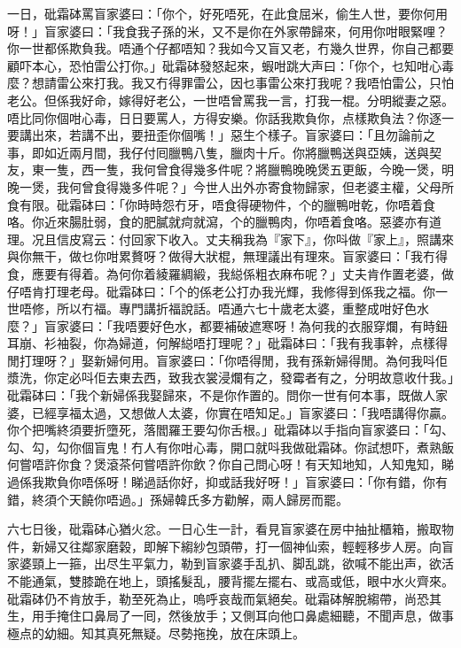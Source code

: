 \documentclass[a5paper, 12pt, openany]{book} %
\begin{document}
	一日，砒霜砵罵盲家婆曰：「你个，好死唔死，在此食屈米，偷生人世，要你何用呀！」盲家婆曰：「我食我子孫的米，又不是你在外家帶歸來，何用你咁眼緊哩？你一世都係欺負我。唔通个仔都唔知？我如今又盲又老，冇幾久世界，你自己都要顧吓本心，恐怕雷公打你。」砒霜砵發怒起來，蝦咁跳大声曰：「你个，乜知咁心毒麼？想請雷公來打我。我又冇得罪雷公，因乜事雷公來打我呢？我唔怕雷公，只怕老公。但係我好命，嫁得好老公，一世唔曾罵我一言，打我一棍。分明縱妻之惡。唔比同你個咁心毒，日日要罵人，方得安樂。你話我欺負你，点樣欺負法？你逐一要講出來，若講不出，要扭歪你個嘴！」惡生个樣子。盲家婆曰：「且勿論前之事，即如近兩月間，我仔付囘臘鴨八隻，臘肉十斤。你將臘鴨送與亞姨，送與契友，東一隻，西一隻，我何曾食得幾多件呢？將臘鴨晚晚煲五更飯，今晚一煲，明晚一煲，我何曾食得幾多件呢？」今世人出外亦寄食物歸家，但老婆主權，父母所食有限。砒霜砵曰：「你時時怨冇牙，唔食得硬物件，个的臘鴨咁乾，你唔着食咯。你近來腸肚弱，食的肥膩就疴就瀉，个的臘鴨肉，你唔着食咯。惡婆亦有道理。况且信皮寫云：付回家下收入。丈夫稱我為『家下』，你呌做『家上』，照講來與你無干，做乜你咁累贅呀？做得大狀棍，無理議出有理來。盲家婆曰：「我冇得食，應要有得着。為何你着綾羅綢緞，我縂係粗衣麻布呢？」丈夫肯作置老婆，做仔唔肯打理老母。砒霜砵曰：「个的係老公打办我光輝，我修得到係我之福。你一世唔修，所以冇福。專門講折福說話。唔通六七十歲老太婆，重整成咁好色水麼？」盲家婆曰：「我唔要好色水，都要補破遮寒呀！為何我的衣服穿爛，有時鈕耳崩、衫袖裂，你為婦道，何解縂唔打理呢？」砒霜砵曰：「我有我事幹，点樣得閒打理呀？」娶新婦何用。盲家婆曰：「你唔得閒，我有孫新婦得閒。為何我呌佢漿洗，你定必呌佢去東去西，致我衣裳浸爛有之，發霉者有之，分明故意收什我。」砒霜砵曰：「我个新婦係我娶歸來，不是你作置的。問你一世有何本事，既做人家婆，已經享福太過，又想做人太婆，你實在唔知足。」盲家婆曰：「我唔講得你贏。你个把嘴終須要折墮死，落閻羅王要勾你舌根。」砒霜砵以手指向盲家婆曰：「勾、勾、勾，勾你個盲鬼！冇人有你咁心毒，開口就呌我做砒霜砵。你試想吓，煮熟飯何嘗唔許你食？煲滾茶何嘗唔許你飲？你自己問心呀！有天知地知，人知鬼知，睇過係我欺負你唔係呀！睇過話你好，抑或話我好呀！」盲家婆曰：「你有錯，你有錯，終須个天饒你唔過。」孫婦韓氏多方勸解，兩人歸房而罷。

	六七日後，砒霜砵心猶火忿。一日心生一計，看見盲家婆在房中抽扯櫃箱，搬取物件，新婦又往鄰家磨榖，即解下縐紗包頭帶，打一個神仙索，輕輕移步人房。向盲家婆頸上一箍，出尽生平氣力，勒到盲家婆手乱扒、脚乱跳，欲喊不能出声，欲活不能通氣，雙膝跪在地上，頭搖髮乱，腰背擺左擺右、或高或低，眼中水火齊來。砒霜砵仍不肯放手，勒至死為止，嗚呼哀哉而氣絕矣。砒霜砵解脫縐帶，尚恐其生，用手掩住口鼻局了一囘，然後放手；又側耳向他口鼻處細聽，不聞声息，做事極点的幼細。知其真死無疑。尽勢拖挽，放在床頭上。
\end{document}
